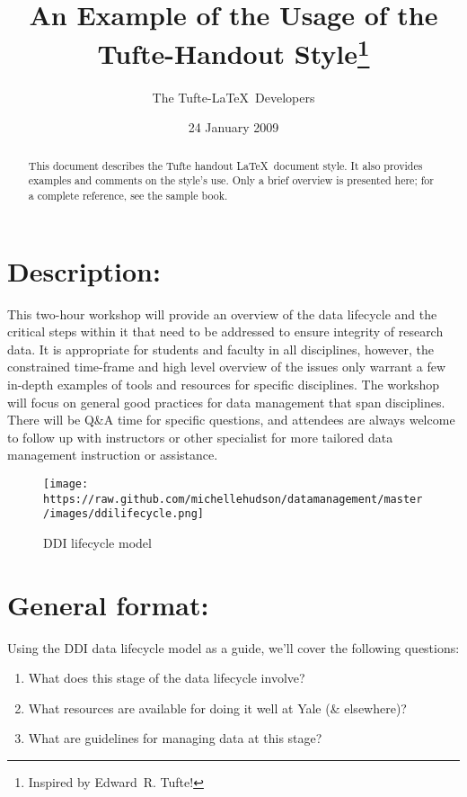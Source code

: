 \documentclass{tufte-handout}
\title{An Example of the Usage of the Tufte-Handout Style\thanks{Inspired by Edward~R. Tufte!}}
\author[The Tufte-LaTeX Developers]{The Tufte-\LaTeX\ Developers}
\date{24 January 2009}  %
\begin{document}
\maketitle%

\begin{abstract}
\noindent This document describes the Tufte handout \LaTeX\ document style.
It also provides examples and comments on the style's use.  Only a brief
overview is presented here; for a complete reference, see the sample book.
\end{abstract}


\section{Description:}\label{description}

This two-hour workshop will provide an overview of the data lifecycle
and the critical steps within it that need to be addressed to ensure
integrity of research data. It is appropriate for students and faculty
in all disciplines, however, the constrained time-frame and high level
overview of the issues only warrant a few in-depth examples of tools and
resources for specific disciplines. The workshop will focus on general
good practices for data management that span disciplines. There will be
Q\&A time for specific questions, and attendees are always welcome to
follow up with instructors or other specialist for more tailored data
management instruction or assistance.

\begin{figure}[htbp]
\centering
\texttt{[image: https://raw.github.com/michellehudson/datamanagement/master/images/ddilifecycle.png]}
\caption{DDI lifecycle model}
\end{figure}

\section{General format:}\label{general-format}

Using the DDI data lifecycle model as a guide, we'll cover the following
questions:

\begin{enumerate}
\def\labelenumi{\arabic{enumi}.}
\itemsep1pt\parskip0pt
\item
  What does this stage of the data lifecycle involve?
\item
  What resources are available for doing it well at Yale (\& elsewhere)?
\item
  What are guidelines for managing data at this stage?
\end{enumerate}
\end{document}
